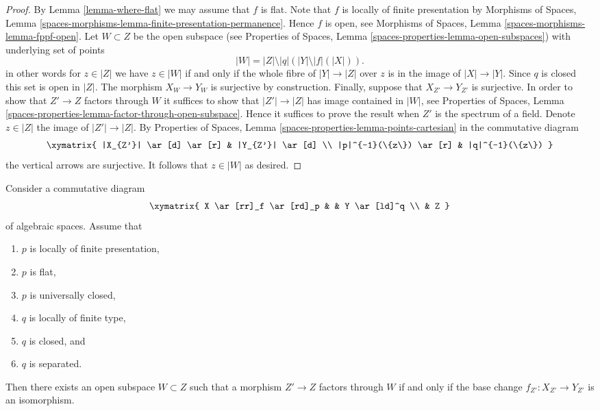 \begin{proof}
By
Lemma \ref{lemma-where-flat}
we may assume that $f$ is flat.
Note that $f$ is locally of finite presentation by
Morphisms of Spaces,
Lemma \ref{spaces-morphisms-lemma-finite-presentation-permanence}.
Hence $f$ is open, see
Morphisms of Spaces, Lemma \ref{spaces-morphisms-lemma-fppf-open}.
Let $W \subset Z$ be the open subspace (see
Properties of Spaces, Lemma
\ref{spaces-properties-lemma-open-subspaces})
with underlying set of points
$$
|W| = |Z| \setminus |q|\left(|Y| \setminus |f|(|X|)\right).
$$
in other words for $z \in |Z|$ we have $z \in |W|$ if and only
if the whole fibre of $|Y| \to |Z|$ over $z$ is in the image of
$|X| \to |Y|$. Since $q$ is closed this set is open in $|Z|$.
The morphism $X_W \to Y_W$ is surjective by construction.
Finally, suppose that $X_{Z'} \to Y_{Z'}$ is surjective.
In order to show that $Z' \to Z$ factors through $W$ it suffices to show
that $|Z'| \to |Z|$ has image contained in $|W|$, see
Properties of Spaces, Lemma
\ref{spaces-properties-lemma-factor-through-open-subspace}.
Hence it suffices to prove the result when $Z'$ is the spectrum of a field.
Denote $z \in |Z|$ the image of $|Z'| \to |Z|$. By
Properties of Spaces,
Lemma \ref{spaces-properties-lemma-points-cartesian}
in the commutative diagram
$$
\xymatrix{
|X_{Z'}| \ar[d] \ar[r] &
|Y_{Z'}| \ar[d] \\
|p|^{-1}(\{z\}) \ar[r] &
|q|^{-1}(\{z\})
}
$$
the vertical arrows are surjective. It follows that $z \in |W|$ as desired.
\end{proof}

\begin{lemma}
\label{lemma-where-isomorphism}
Consider a commutative diagram
$$
\xymatrix{
X \ar[rr]_f \ar[rd]_p & & Y \ar[ld]^q \\
& Z
}
$$
of algebraic spaces. Assume that
\begin{enumerate}
\item $p$ is locally of finite presentation,
\item $p$ is flat,
\item $p$ is universally closed,
\item $q$ is locally of finite type,
\item $q$ is closed, and
\item $q$ is separated.
\end{enumerate}
Then there exists an open subspace $W \subset Z$
such that a morphism $Z' \to Z$ factors through $W$ if and only if the
base change $f_{Z'} : X_{Z'} \to Y_{Z'}$ is an isomorphism.
\end{lemma}

